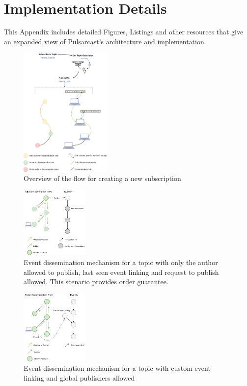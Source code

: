 
\section{Implementation Details}
\label{section:appendix}

This Appendix includes detailed Figures, Listings and other resources that give
an expanded view of Pulsarcast's architecture and implementation.

\begin{figure}
  \centering
  \includegraphics[width=0.4\textwidth]{../images/pulsarcast-subscription-flow.png}
  \caption{Overview of the flow for creating a new subscription}
  \label{fig:pulsarcast-subscription-flow}
\end{figure}

\begin{figure}
  \centering
  \includegraphics[width=0.3\textwidth]{../images/pulsarcast-publish-order-guarantee.png}
  \caption{Event dissemination mechanism for a topic with only the author allowed to publish, last seen event linking and request to publish allowed. This scenario provides order guarantee.}
  \label{fig:pulsarcast-publish-order-guarantee}
\end{figure}

\begin{figure}
  \centering
  \includegraphics[width=0.3\textwidth]{../images/pulsarcast-publish-custom.png}
  \caption{Event dissemination mechanism for a topic with custom event linking and global publishers allowed}
  \label{fig:pulsarcast-publish-custom}
\end{figure}

